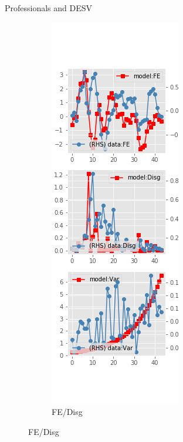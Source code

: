 \documentclass{beamer}
\begin{document}
\begin{frame}{Professionals and DESV}
\begin{figure}[ht]
\begin{subfigure}[b]{0.2\textwidth}
		\end{subfigure}
		\hfill
		\begin{subfigure}[b]{0.2\textwidth}
			\caption{FE/Disg}
			\includegraphics[width=\textwidth, height = 0.8\textheight]{figuresDraft/spf_de_est_sv_diag1.png}

\end{subfigure}
\end{figure}
\end{frame}
\end{document}

